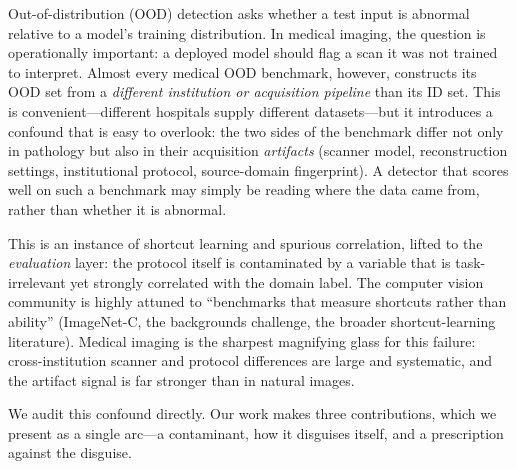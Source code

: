 \documentclass{article}
\begin{document}
Out-of-distribution (OOD) detection asks whether a test input is abnormal
relative to a model's training distribution. In medical imaging, the question
is operationally important: a deployed model should flag a scan it was not
trained to interpret. Almost every medical OOD benchmark, however, constructs
its OOD set from a \emph{different institution or acquisition pipeline} than its
ID set. This is convenient---different hospitals supply different datasets---but
it introduces a confound that is easy to overlook: the two sides of the
benchmark differ not only in pathology but also in their acquisition
\emph{artifacts} (scanner model, reconstruction settings, institutional
protocol, source-domain fingerprint). A detector that scores well on such a
benchmark may simply be reading where the data came from, rather than whether it
is abnormal.

This is an instance of shortcut learning and spurious correlation, lifted to the
\emph{evaluation} layer: the protocol itself is contaminated by a variable that
is task-irrelevant yet strongly correlated with the domain label. The computer
vision community is highly attuned to ``benchmarks that measure shortcuts rather
than ability'' (ImageNet-C, the backgrounds challenge, the broader
shortcut-learning literature). Medical imaging is the sharpest magnifying glass
for this failure: cross-institution scanner and protocol differences are large
and systematic, and the artifact signal is far stronger than in natural images.

We audit this confound directly. Our work makes three contributions, which we
present as a single arc---a contaminant, how it disguises itself, and a
prescription against the disguise.
\end{document}
